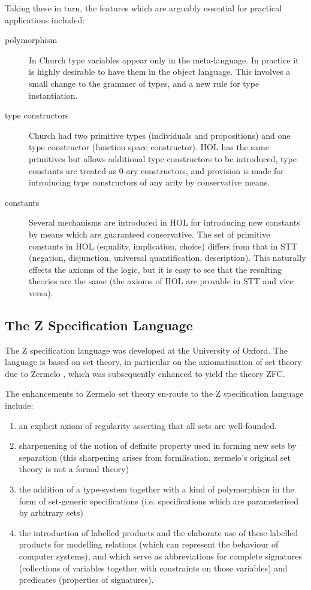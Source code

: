 \documentclass{rbjk}
\begin{document}
\begin{article}
Taking these in turn, the features which are arguably essential for
practical applications included:

\begin{description}
\item[polymorphism]
In Church\cite{church40} type variables appear only in the
meta-language.
In practice it is highly desirable to have them in the object
language.
This involves a small change to the grammer of types, and a new rule
for type instantiation.
\item[type constructors]
Church had two primitive types (individuals and propositions) and one
type constructor (function space constructor).
HOL has the same primitives but allows additional type constructors to
be introduced, type constants are treated as 0-ary constructors, and
provision is made for introducing type constructors of any arity by
conservative means.
\item[constants]
Several mechanisms are introduced in HOL for introducing new constants
by means which are guaranteed conservative.
The set of primitive constants in HOL (equality, implication, choice)
differs from that in STT (negation, disjunction, universal
quantification, description).
This naturally effects the axioms of the logic, but it is easy to see
that the resulting theories are the same (the axioms of HOL are
provable in STT and vice versa).

\end{description}

\subsection{The Z Specification Language}

The Z specification language was developed at the University of
Oxford.
The language is based on set theory, in particular on the
axiomatisation of set theory due to Zermelo \cite{zermelo08}, which
was subsequently enhanced to yield the theory ZFC.

The enhancements to Zermelo set theory en-route to the Z specification
language include:
\begin{enumerate}
\item an explicit axiom of regularity asserting that all sets are
  well-founded.
\item sharpenening of the notion of definite property used in
  forming new sets by separation (this sharpening arises from
  formlisation, zermelo's original set theory is not a formal theory)
\item the addition of a type-system together with a kind of
  polymorphism in the form of set-generic specifications
  (i.e. specifications which are parameterised by arbitrary sets)
\item the introduction of labelled products and the elaborate use of
  these labelled products for modelling relations (which can represent
  the behaviour of computer systems), and which serve as abbreviations
  for complete signatures (collections of variables together with
  constraints on those variables) and predicates (properties of signatures).
\end{enumerate}


\end{article}
\end{document}
